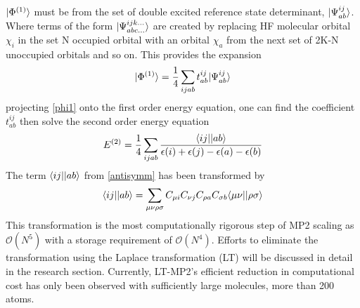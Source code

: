        $| \Phi^{(1)} \rangle$ must be from the set of double excited reference state determinant, $| \Psi^{ij}_{ab} \rangle$. Where terms of the form $| \Psi^{ijk\dots}_{abc\dots} \rangle$ are created by replacing HF molecular orbital $\chi_i$ in the set N occupied orbital with an orbital $\chi_a$ from the next set of 2K-N unoccupied orbitals and so on.  This provides the expansion 
         \begin{equation} \label{phi1}
          | \Phi^{(1)} \rangle 
          = \frac{1}{4}\sum_{ijab} t^{ij}_{ab} | \Psi^{ij}_{ab} \rangle
        \end{equation}
      projecting \cref{phi1} onto the first order energy equation, one can find the coefficient $t^{ij}_{ab}$ then solve the second order energy equation %
        \begin{equation}
          E^{(2)} = \frac{1}{4} \sum_{ijab} \frac{\langle ij || ab \rangle}{\epsilon{(i) + \epsilon(j) - \epsilon(a) - \epsilon(b)}}
        \end{equation}
      The term $\langle ij || ab \rangle$ from \cref{antisymm} has been transformed by
        \begin{equation}
          \langle ij || ab \rangle = \sum_{\mu\nu\rho\sigma} C_{\mu i} C_{\nu j} C_{\rho a} C_{\sigma b} \langle\mu \nu | | \rho \sigma \rangle
        \end{equation}
      This transformation is the most computationally rigorous step of MP2 scaling as $\mathcal{O}(N^5)$ with a storage requirement of $\mathcal{O}(N^4)$.  Efforts to eliminate the transformation using the Laplace transformation (LT) will be discussed in detail in the research section.  Currently, LT-MP2's efficient reduction in computational cost has only been observed with sufficiently large molecules, more than 200 atoms.   
